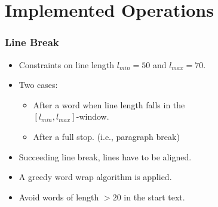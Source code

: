 \documentclass{beamer}
\begin{document}
\section{Implemented Operations}

\begin{frame}
\frametitle{Line Break}


\begin{itemize}
\item Constraints on line length $l_{min}=50$ and $l_{max}=70.$



\item Two cases: 



\begin{itemize}
\item After a word when line length falls in the\\
 $[l_{min},l_{max}]$-window.
\item After a full stop. (i.e., paragraph break)
\end{itemize}


\item Succeeding line break, lines have to be aligned.

\item A greedy word wrap algorithm is applied. 

\item Avoid words of length $>20$ in the start text.
\end{itemize}

\end{frame}
\end{document}
